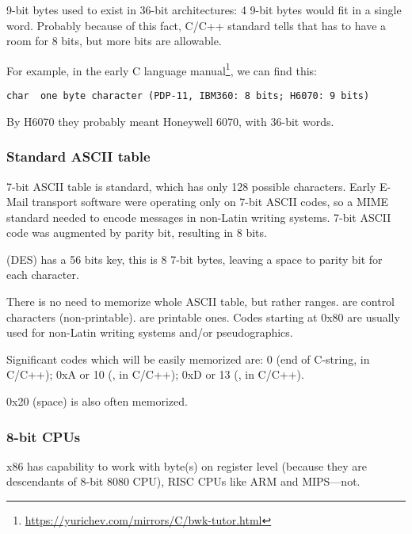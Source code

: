 9-bit bytes used to exist in 36-bit architectures: 4 9-bit bytes would fit in a single \gls{word}.
Probably because of this fact, C/C++ standard tells that  has to have a room for  8 bits, but more
bits are allowable.

For example, in the early C language manual\footnote{\url{https://yurichev.com/mirrors/C/bwk-tutor.html}}, we can find this:

\begin{lstlisting}
char  one byte character (PDP-11, IBM360: 8 bits; H6070: 9 bits)
\end{lstlisting}

By H6070 they probably meant Honeywell 6070, with 36-bit words.

\subsubsection{Standard ASCII table}

7-bit ASCII table is standard, which has only 128 possible characters.
Early E-Mail transport software were operating only on 7-bit ASCII codes, so a \ac{MIME} standard needed to encode messages
in non-Latin writing systems.
7-bit ASCII code was augmented by parity bit, resulting in 8 bits.

 (\ac{DES}) has a 56 bits key, this is 8 7-bit bytes,
leaving a space to parity bit for each character.

There is no need to memorize whole \ac{ASCII} table, but rather ranges.
 are control characters (non-printable).
 are printable ones.
Codes starting at 0x80 are usually used for non-Latin writing systems and/or pseudographics.

Significant codes which will be easily memorized are:
0 (end of C-string,  in C/C++);
0xA or 10 (,  in C/C++);
0xD or 13 (,  in C/C++).

0x20 (space) is also often memorized.

\subsubsection{8-bit CPUs}

x86 has capability to work with byte(s) on register level (because they are descendants of 8-bit 8080 CPU),
RISC CPUs like ARM and MIPS---not.

